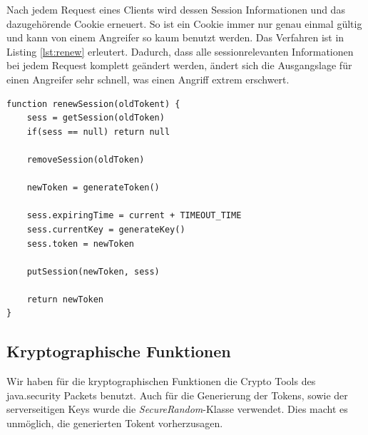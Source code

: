 Nach jedem Request eines Clients wird dessen Session Informationen und das dazugehörende Cookie
erneuert. So ist ein Cookie immer nur genau einmal gültig und kann von einem Angreifer so kaum 
benutzt werden. Das Verfahren ist in Listing \ref{lst:renew} erleutert. Dadurch, dass alle 
sessionrelevanten Informationen bei jedem Request komplett geändert werden, ändert sich die
Ausgangslage für einen Angreifer sehr schnell, was einen Angriff extrem erschwert.
\newline
\begin{lstlisting}[caption=Erneuern einer Session,label={lst:renew}]
function renewSession(oldTokent) {
    sess = getSession(oldToken)
    if(sess == null) return null

    removeSession(oldToken)

    newToken = generateToken()

    sess.expiringTime = current + TIMEOUT_TIME
    sess.currentKey = generateKey()
    sess.token = newToken

    putSession(newToken, sess)

    return newToken
}
\end{lstlisting}

\subsection{Kryptographische Funktionen}

Wir haben für die kryptographischen Funktionen die Crypto Tools des java.security Packets benutzt. Auch für die Generierung
der Tokens, sowie der serverseitigen Keys wurde die \textit{SecureRandom}-Klasse verwendet. Dies macht es unmöglich, die
generierten Tokent vorherzusagen.
